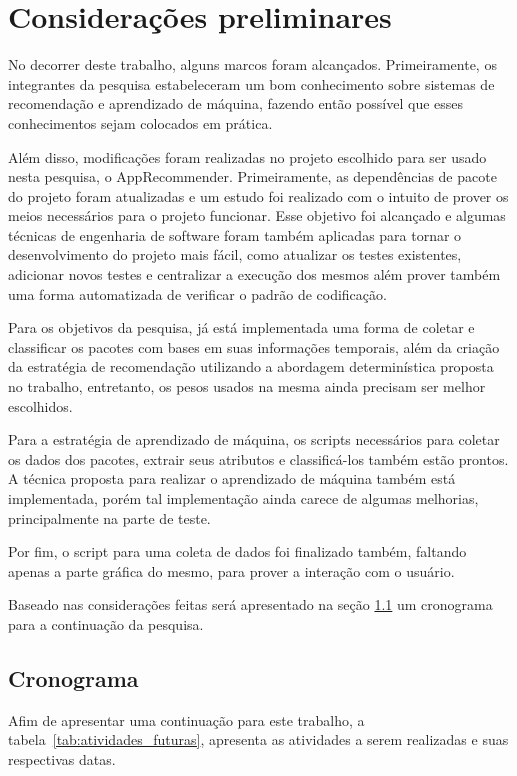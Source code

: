 \chapter[Considerações preliminares]{Considerações preliminares}

No decorrer deste trabalho, alguns marcos foram alcançados. Primeiramente, os
integrantes da pesquisa estabeleceram um bom conhecimento sobre sistemas de
recomendação e aprendizado de máquina, fazendo então possível que esses
conhecimentos sejam colocados em prática.

Além disso, modificações foram realizadas no projeto escolhido para ser usado
nesta pesquisa, o AppRecommender. Primeiramente, as dependências de pacote do
projeto foram atualizadas e um estudo foi realizado com o intuito de prover os
meios necessários para o projeto funcionar. Esse objetivo foi alcançado e
algumas técnicas de engenharia de software foram também aplicadas para tornar o
desenvolvimento do projeto mais fácil, como atualizar os testes existentes, adicionar novos testes
e centralizar a execução dos mesmos além prover também uma forma automatizada de
verificar o padrão de codificação.

Para os objetivos da pesquisa, já está implementada uma forma de coletar e
classificar os pacotes com bases em suas informações temporais, além da criação
da estratégia de recomendação utilizando a abordagem determinística proposta no
trabalho, entretanto, os pesos usados na mesma ainda precisam ser melhor escolhidos.

Para a estratégia de aprendizado de máquina, os scripts necessários para coletar
os dados dos pacotes, extrair seus atributos e classificá-los também estão
prontos. A técnica proposta para realizar o aprendizado de máquina também está
implementada, porém tal implementação ainda carece de algumas melhorias,
principalmente na parte de teste.

Por fim, o script para uma coleta de dados foi finalizado também, faltando
apenas a parte gráfica do mesmo, para prover a interação com o usuário.

Baseado nas considerações feitas será apresentado na seção \ref{sec:cronagrama} um cronograma
para a continuação da pesquisa.

\section{Cronograma} \label{sec:cronagrama}

Afim de apresentar uma continuação para este trabalho, a tabela~\ref{tab:atividades_futuras},
apresenta as atividades a serem realizadas e suas respectivas datas.

